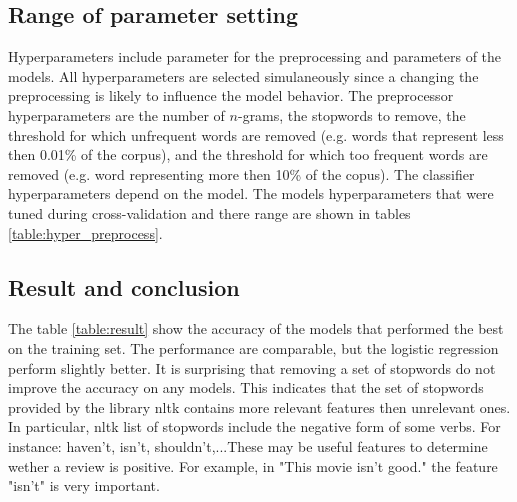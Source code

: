 \documentclass[10pt]{article}
\begin{document}
\subsection*{Range of parameter setting}

Hyperparameters include parameter for the preprocessing and parameters of the models. All hyperparameters are selected simulaneously since a changing the preprocessing is likely to influence the model behavior. The preprocessor hyperparameters are the number of $n$-grams, the stopwords to remove, the threshold for which unfrequent words are removed (e.g. words that represent less then 0.01\% of the corpus), and the threshold for which too frequent words are removed (e.g. word representing more then 10\% of the copus). The classifier hyperparameters depend on the model. The models hyperparameters that were tuned during cross-validation and there range are shown in tables \ref{table:hyper_preprocess}.

\begin{table}[h!]
    \caption{Range of hyperparameters}
    \label{table:hyper_preprocess}
\end{table}


\subsection*{Result and conclusion}
The table \ref{table:result} show the accuracy of the models that performed the best on the training set. The performance are comparable, but the logistic regression perform slightly better. It is surprising that removing a set of stopwords do not improve the accuracy on any models. This indicates that the set of stopwords provided by the library nltk contains more relevant features then unrelevant ones. In particular, nltk list of stopwords include the negative form of some verbs. For instance: haven't, isn't, shouldn't,...These may be useful features to determine wether a review is positive. For example, in "This movie isn't good." the feature "isn't" is very important.
\end{document}
